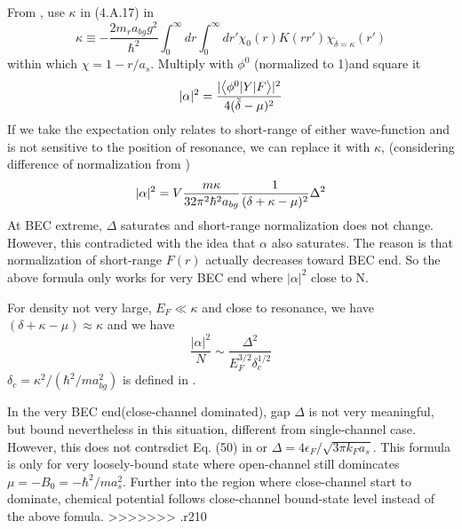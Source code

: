 From , use $\kappa$ in (4.A.17) in \cite{Leggett} 
\begin{equation}
\kappa\equiv-\frac{2m_{r}a_{bg}g^{2}}{\hbar^{2}}\int^{\infty}_{0}dr\int^{\infty}_{0}dr'\chi_{0}(r)K(rr')\chi_{{\tilde\delta=\kappa}}(r')
\end{equation}
within which $\chi=1-r/a_{s}$.  
Multiply  with $\phi^{0}$ (normalized to 1)and square it
\begin{equation}
|\alpha|^{2}=\frac{\lvert{\ensuremath{\bigl<{\phi^{0}{\lvert{Y}\rvert}F}\bigr>}}\rvert^{2}}{4(\tilde\delta-\mu)^{2}}
\end{equation}
If we take the expectation only relates to short-range of either wave-function and is not sensitive to the position of resonance, we can replace it with $\kappa$,  (considering difference of normalization from )
\begin{equation}
|\alpha|^{2}=V\frac{m\kappa}{32\pi^{2}\hbar^{2}a_{bg}}\frac{1}{(\delta+\kappa-\mu)^{2}}\Delta^{2}
\end{equation}
At BEC extreme, $\Delta$ saturates and short-range normalization does not change.  However, this contradicted with the idea that $\alpha$ also saturates. The reason is that normalization of short-range $F(r)$ actually decreases toward BEC end.  So the above formula only works for very BEC end where $|\alpha|^{2}$ close to N.   

For density not very large, $E_{F}\ll\kappa$ and close to resonance, we have $(\delta+\kappa-\mu)\approx\kappa$ and we have 
\begin{equation}
\frac{|\alpha|^{2}}{N}\sim\frac{\Delta^{2}}{E_{F}^{3/2}\delta_{c}^{1/2}}
\end{equation}
$\delta_{c}=\kappa^{2}/(\hbar^{2}/ma_{bg}^{2})$ is defined in \cite{Leggett}.


In the very BEC end(close-channel dominated), gap $\Delta$ is not very meaningful, but bound nevertheless in this situation, different from single-channel case.  However, this does not contrsdict Eq. (50) in \cite{shizhongUniv} or $\Delta=4\epsilon_F/\sqrt{3\pi{}k_Fa_s}$.  This formula is only for very loosely-bound state where open-channel still domincates $\mu=-B_0=-\hbar^2/ma_s^2$. Further into the region where close-channel start to dominate, chemical potential follows close-channel bound-state  level instead of the above fomula. >>>>>>> .r210

